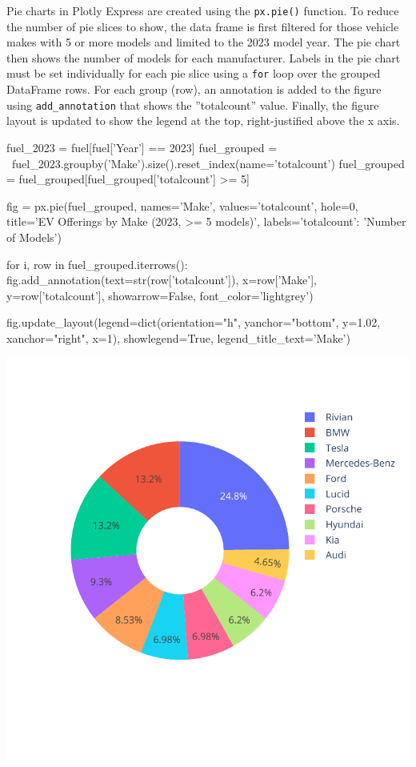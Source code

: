 Pie charts in Plotly Express are created using the \texttt{px.pie()} function. To reduce the number of pie slices to show, the data frame is first filtered for those vehicle makes with 5 or more models and limited to the 2023 model year. The pie chart then shows the number of models for each manufacturer. Labels in the pie chart must be set individually for each pie slice using a \texttt{for} loop over the grouped DataFrame rows. For each group (row), an annotation is added to the figure using \texttt{add\_annotation} that shows the ''totalcount'' value. Finally, the figure layout is updated to show the legend at the top, right-justified above the x axis.

\begin{samepage}
\begin{pythoncode}
fuel_2023 = fuel[fuel['Year'] == 2023]
fuel_grouped = \
    fuel_2023.groupby('Make').size().reset_index(name='totalcount')
fuel_grouped = fuel_grouped[fuel_grouped['totalcount'] >= 5]

fig = px.pie(fuel_grouped, 
    names='Make', values='totalcount', hole=0,
    title='EV Offerings by Make (2023, >= 5 models)',
    labels={'totalcount': 'Number of Models'})

for i, row in fuel_grouped.iterrows():
    fig.add_annotation(text=str(row['totalcount']),
            x=row['Make'], y=row['totalcount'], 
            showarrow=False, font_color='lightgrey')

fig.update_layout(legend=dict(orientation="h", yanchor="bottom", 
    y=1.02, xanchor="right", x=1),
    showlegend=True, legend_title_text='Make')
\end{pythoncode}
\end{samepage}

\begin{center}
  \includegraphics[width=.6\textwidth]{px.fuel.pie.pdf}
\end{center}

